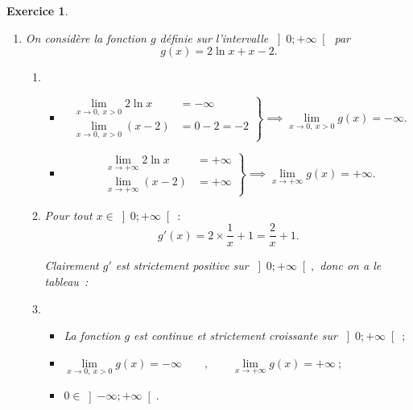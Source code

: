 \documentclass[10pt]{article}
\newtheorem{exo}{Exercice}
\begin{document}
\begin{exo}



\begin{enumerate}
\item On considère la fonction $g$ définie sur l'intervalle $\left]0;+\infty\right[$ par
\[g(x) =2\ln x+x-2.\]
\begin{enumerate}
\item  ~{}
\begin{itemize}
\item[\textbullet] \[\left.
    \begin{array}{ll}
        \lim\limits_{x\to 0,~x>0}2\ln x&= -\infty\\
        \lim\limits_{x\to 0,~x>0}(x-2)&= 0-2=-2
    \end{array}
\right \}\implies \lim\limits_{x\to 0,~x>0}g(x)= -\infty.\]
\item[\textbullet] \[\left.
    \begin{array}{ll}
        \lim\limits_{x\to +\infty}2\ln x&= +\infty\\
        \lim\limits_{x\to +\infty}(x-2)&= +\infty
    \end{array}
\right \}\implies \lim\limits_{x\to +\infty}g(x)= +\infty.\]
\end{itemize}

\item  Pour tout $x\in\left]0;+\infty\right[~:$
\[g'(x)=2\times\frac{1}{x}+1=\frac{2}{x}+1.\]

Clairement $g'$ est strictement positive sur $\left]0;+\infty\right[,$ donc on a le tableau~:

\medskip
\begin{center}
\end{center}

\item \begin{itemize}
\item[\textbullet] La fonction $g$ est continue et strictement croissante sur $\left]0;+\infty\right[~;$
\item[\textbullet] $\lim\limits_{x\to 0,~x>0}g(x)= -\infty\qquad,\qquad \lim\limits_{x\to +\infty}g(x)= +\infty~;$
\item[\textbullet] $0\in\left]-\infty;+\infty\right[.$
\end{itemize}


\end{enumerate}
\end{enumerate}
\end{exo}
\end{document}

